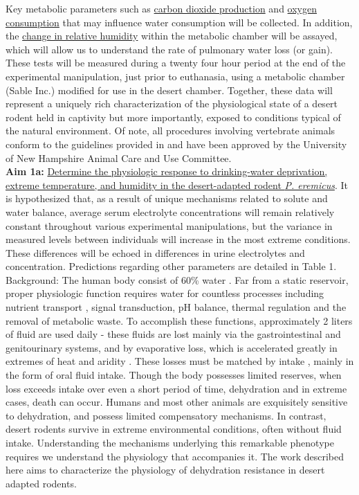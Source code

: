\documentclass[12pt]{article}
\begin{document}
Key metabolic parameters such as \ul{carbon dioxide production} and \ul{oxygen consumption} that may influence water consumption will be collected. In addition, the \ul{change in relative humidity} within the metabolic chamber will be assayed, which will allow us to understand the rate of pulmonary water loss (or gain). These tests will be measured during a twenty four hour period at the end of the experimental manipulation, just prior to euthanasia, using a metabolic chamber (Sable Inc.) modified for use in the desert chamber. Together, these data will represent a uniquely rich characterization of the physiological state of a desert rodent held in captivity but more importantly, exposed to conditions typical of the natural environment. Of note, all procedures involving vertebrate animals conform to the guidelines provided in \citep{Sikes:2011dz} and have been approved by the University of New Hampshire Animal Care and Use Committee. \\

\noindent \textbf{Aim 1a:} \ul{Determine the physiologic response to drinking-water deprivation, extreme temperature, and humidity in the desert-adapted rodent \textit{P. eremicus}}. It is hypothesized that, as a result of unique mechanisms related to solute and water balance, average serum electrolyte concentrations will remain relatively constant throughout various experimental manipulations, but the variance in measured levels between individuals will increase in the most extreme conditions. These differences will be echoed in differences in urine electrolytes and concentration. Predictions regarding other parameters are detailed in Table 1. \\


Background: The human body consist of 60\% water \citep{Jequier:2009cz}. Far from a static reservoir, proper physiologic function requires water for countless processes including nutrient transport \citep{Haussinger:1996wl}, signal transduction, pH balance, thermal regulation \citep{Montain:1999ux} and the removal of metabolic waste. To accomplish these functions, approximately 2 liters of fluid are used daily - these fluids are lost mainly via the gastrointestinal and genitourinary systems, and by evaporative loss, which is accelerated greatly in extremes of heat and aridity \citep{Cheuvront:2010eg}. These losses must be matched by intake \citep{Jequier:2009cz}, mainly in the form of oral fluid intake. Though the body possesses limited reserves, when loss exceeds intake over even a short period of time, dehydration and in extreme cases, death can occur. Humans and most other animals are exquisitely sensitive to dehydration, and possess limited compensatory mechanisms. In contrast, desert rodents survive in extreme environmental conditions, often without fluid intake. Understanding the mechanisms underlying this remarkable phenotype requires we understand the physiology that accompanies it. The work described here aims to characterize the physiology of dehydration resistance in desert adapted rodents. \\
\end{document}
